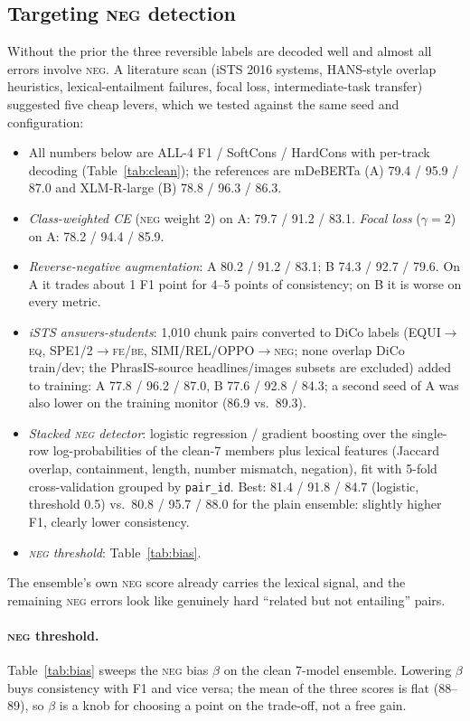 \documentclass[11pt,a4paper]{article}
\newcommand{\EQ}{\textsc{eq}}
\newcommand{\FE}{\textsc{fe}}
\newcommand{\BE}{\textsc{be}}
\newcommand{\NEG}{\textsc{neg}}
\begin{document}
\subsection{Targeting \NEG{} detection}\label{sec:neg}
Without the prior the three reversible labels are decoded well and almost all
errors involve \NEG. A literature scan (iSTS 2016 systems, HANS-style overlap
heuristics, lexical-entailment failures, focal loss, intermediate-task
transfer) suggested five cheap levers, which we tested against the same seed
and configuration:
\begin{itemize}
\item All numbers below are ALL-4 F1 / SoftCons / HardCons with per-track
  decoding (Table~\ref{tab:clean}); the references are mDeBERTa (A)
  79.4 / 95.9 / 87.0 and XLM-R-large (B) 78.8 / 96.3 / 86.3.
\item \emph{Class-weighted CE} (\NEG{} weight 2) on A: 79.7 / 91.2 / 83.1.
  \emph{Focal loss} ($\gamma=2$) on A: 78.2 / 94.4 / 85.9.
\item \emph{Reverse-negative augmentation}: A 80.2 / 91.2 / 83.1;
  B 74.3 / 92.7 / 79.6. On A it trades about 1 F1 point for 4--5 points of
  consistency; on B it is worse on every metric.
\item \emph{iSTS answers-students}: 1{,}010 chunk pairs converted to DiCo labels
  (EQUI$\to$\EQ, SPE1/2$\to$\FE/\BE, SIMI/REL/OPPO$\to$\NEG; none overlap DiCo
  train/dev; the PhrasIS-source headlines/images subsets are excluded) added to
  training: A 77.8 / 96.2 / 87.0, B 77.6 / 92.8 / 84.3; a second seed of A was
  also lower on the training monitor (86.9 vs.\ 89.3).
\item \emph{Stacked \NEG{} detector}: logistic regression / gradient boosting
  over the single-row log-probabilities of the clean-7 members plus lexical
  features (Jaccard overlap, containment, length, number mismatch, negation),
  fit with 5-fold cross-validation grouped by \texttt{pair\_id}. Best: 81.4 / 91.8
  / 84.7 (logistic, threshold 0.5) vs.\ 80.8 / 95.7 / 88.0 for the plain
  ensemble: slightly higher F1, clearly lower consistency.
\item \emph{\NEG{} threshold}: Table~\ref{tab:bias}.
\end{itemize}
The ensemble's own \NEG{} score already carries the lexical signal, and the
remaining \NEG{} errors look like genuinely hard ``related but not entailing''
pairs.

\paragraph{\NEG{} threshold.}
Table~\ref{tab:bias} sweeps the \NEG{} bias $\beta$ on the clean 7-model
ensemble. Lowering $\beta$ buys consistency with F1 and vice versa; the mean
of the three scores is flat (88--89), so $\beta$ is a knob for choosing a point
on the trade-off, not a free gain.
\end{document}
